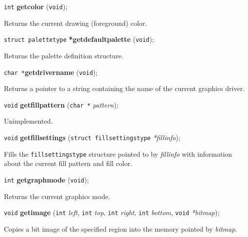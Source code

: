 \documentclass[a4paper,11pt]{article}
\newcommand{\V}{\texttt{void}}      %
\newcommand{\I}{\texttt{int}}       %
\newcommand{\C}{\texttt{char *}}    %
\newcommand{\func}[1]{\textbf{#1}}  %
\newcommand{\A}[1]{\emph{#1}}       %
\newenvironment{bgi}
{ %
  \begin{snugshade}
}
{ %
  \end{snugshade}
}
\begin{document}

\begin{bgi}
\I{} \func{getcolor} (\V{});
\end{bgi}

Returns the current drawing (foreground) color.


\begin{bgi}
\texttt{struct palettetype} \func{*getdefaultpalette} (\V{});
\end{bgi}

Returns the palette definition structure.


\begin{bgi}
\C{}\func{getdrivername} (\V{});
\end{bgi}

Returns a pointer to a string containing the name of the current
graphics driver.


\begin{bgi}
\V{} \func{getfillpattern} (\C{} \A{pattern}); 
\end{bgi}


Unimplemented.


\begin{bgi}
\V{} \func{getfillsettings} (\texttt{struct fillsettingstype}
\A{*fillinfo});
\end{bgi}

Fills the \texttt{fillsettingstype} structure pointed to by
\A{fillinfo} with information about the current fill pattern and fill
color.


\begin{bgi}
\I{} \func{getgraphmode} (\V{});
\end{bgi}

Returns the current graphics mode.


\begin{bgi}
\V{} \func{getimage} (\I{} \A{left}, \I{} \A{top}, \I{} \A{right},
\I{} \A{bottom}, \V{} \A{*bitmap});
\end{bgi}

Copies a bit image of the specified region into the memory pointed by
\A{bitmap}.
\end{document}
